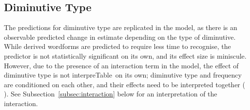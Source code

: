 \begin{table}[ht]
\centering
{}
\caption[Summary of fixed effects from the experimental model]{Summary of fixed effects from the experimental model. All continuous predictors centered and standardised, categorical predictor \textit{Diminutive Type} sum-coded, predictors the effects of which have achieved significance ($p$<0.05) have their names and $p$-values in boldface.}
\label{tab:reg-fixed}
\end{table}

\subsection{Diminutive Type} \label{subsec:dimtype}
The predictions for diminutive type are replicated in the model, as there is an observable predicted change in estimate depending on the type of diminutive. While derived wordforms are predicted to require less time to recognise, the predictor is not statistically significant on its own, and its effect size is miniscule. However, due to the presence of an interaction term in the model, the effect of diminutive type is not interpreTable~on its own; diminutive type and frequency are conditioned on each other, and their effects need to be interpreted together (\citeauthor{Winter+2019} \citeyear{Winter+2019}). See Subsection~\ref{subsec:interaction} below for an interpretation of the interaction.

